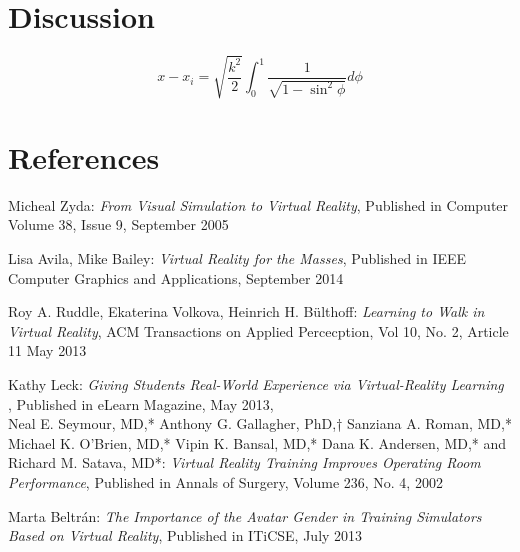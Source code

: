 \documentclass[11pt]{report}
\begin{document}
\chapter{Discussion}

	\begin{equation}
		x - x_i = \sqrt{\frac{k^2}{2}} \int_0^1 \frac{1}{\sqrt{1-\sin^2 \phi}} d\phi
	\end{equation}


\chapter{References}


%
\begin{bibliography}{9}

  	Micheal Zyda:
  	\emph{From Visual Simulation to Virtual Reality},
  	Published in Computer Volume 38, Issue 9,
  	September 2005
  	
  	Lisa Avila, Mike Bailey:
  	\emph{Virtual Reality for the Masses},
  	Published in IEEE Computer Graphics and Applications,
  	September 2014
  	
  	Roy A. Ruddle, Ekaterina Volkova, Heinrich H. Bülthoff:
  	\emph{Learning to Walk in Virtual Reality},
  	ACM Transactions on Applied Percecption, Vol 10, No. 2, Article 11
  	May 2013
  	
  	Kathy Leck:
  	\emph{Giving Students Real-World Experience via Virtual-Reality Learning },
  	Published in eLearn Magazine,
  	May 2013, \\
  	\hyperlink{http://elearnmag.acm.org/archive.cfm?aid=2484903}
  	
  	Neal E. Seymour, MD,* Anthony G. Gallagher, PhD,† Sanziana A. Roman, MD,* Michael K. O’Brien, MD,* Vipin K. Bansal, MD,*
Dana K. Andersen, MD,* and Richard M. Satava, MD*:
  	\emph{Virtual Reality Training Improves Operating Room Performance},
  	Published in Annals of Surgery,
  	Volume 236, No. 4,
  	2002

  	Marta Beltrán:
  	\emph{The Importance of the Avatar Gender in Training Simulators Based on Virtual Reality},
  	Published in ITiCSE,
  	July 2013
  	

\end{bibliography}	
	
\end{document}
